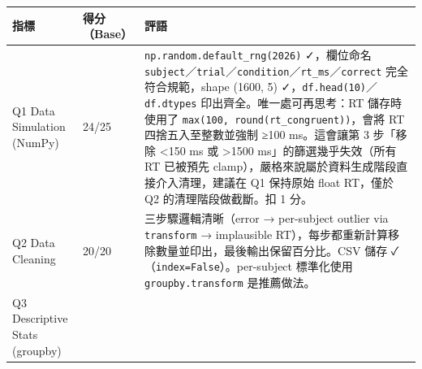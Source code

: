 \documentclass[
  14pt,
]{extarticle}
\begin{document}
\begin{longtable}[]{@{}lll@{}}
\toprule
\begin{minipage}[b]{0.10\columnwidth}\raggedright
指標\strut
\end{minipage} & \begin{minipage}[b]{0.04\columnwidth}\raggedright
得分（Base）\strut
\end{minipage} & \begin{minipage}[b]{0.78\columnwidth}\raggedright
評語\strut
\end{minipage}\tabularnewline
\midrule
\endhead
\begin{minipage}[t]{0.10\columnwidth}\raggedright
Q1 Data Simulation (NumPy)\strut
\end{minipage} & \begin{minipage}[t]{0.04\columnwidth}\raggedright
24/25\strut
\end{minipage} & \begin{minipage}[t]{0.78\columnwidth}\raggedright
\texttt{np.random.default\_rng(2026)} ✓，欄位命名
\texttt{subject}／\texttt{trial}／\texttt{condition}／\texttt{rt\_ms}／\texttt{correct}
完全符合規範，shape (1600, 5)
✓，\texttt{df.head(10)}／\texttt{df.dtypes} 印出齊全。唯一處可再思考：RT
儲存時使用了 \texttt{max(100,\ round(rt\_congruent))}，會將 RT
四捨五入至整數並強制 ≥100 ms。這會讓第 3 步「移除 \textless150 ms 或
\textgreater1500 ms」的篩選幾乎失效（所有 RT 已被預先
clamp），嚴格來說屬於資料生成階段直接介入清理，建議在 Q1 保持原始 float
RT，僅於 Q2 的清理階段做截斷。扣 1 分。\strut
\end{minipage}\tabularnewline
\begin{minipage}[t]{0.10\columnwidth}\raggedright
Q2 Data Cleaning\strut
\end{minipage} & \begin{minipage}[t]{0.04\columnwidth}\raggedright
20/20\strut
\end{minipage} & \begin{minipage}[t]{0.78\columnwidth}\raggedright
三步驟邏輯清晰（error → per-subject outlier via \texttt{transform} →
implausible RT），每步都重新計算移除數量並印出，最後輸出保留百分比。CSV
儲存 ✓（\texttt{index=False}）。per-subject 標準化使用
\texttt{groupby.transform} 是推薦做法。\strut
\end{minipage}\tabularnewline
\begin{minipage}[t]{0.10\columnwidth}\raggedright
Q3 Descriptive Stats (groupby)\strut
\end{minipage} & \begin{minipage}[t]{0.04\columnwidth}\raggedright

\end{minipage}
\end{longtable}
\end{document}
